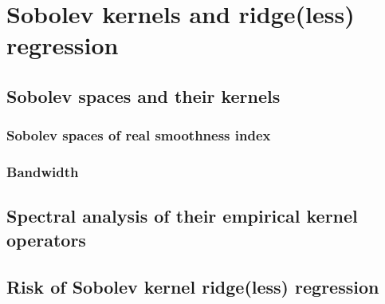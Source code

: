 \chapter{Sobolev kernels and ridge(less) regression}

\section{Sobolev spaces and their kernels}
\subsection{Sobolev spaces of real smoothness index}
\subsection{Bandwidth}

\section{Spectral analysis of their empirical kernel operators}

\section{Risk of Sobolev kernel ridge(less) regression}